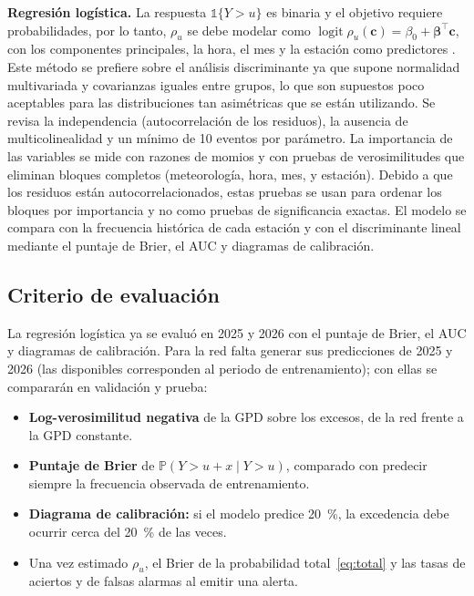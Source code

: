 \documentclass[11pt]{article}
\begin{document}
\textbf{Regresión logística.} La respuesta $\mathbb{1}\{Y>u\}$ es binaria y el objetivo requiere probabilidades, por lo tanto, $\rho_u$  se debe modelar como $\operatorname{logit}\rho_u(\mathbf{c}) = \beta_0 + \boldsymbol{\beta}^\top\mathbf{c}$, con los componentes principales, la hora, el mes y la estación como predictores \citep{gyarmati2017}. Este método se prefiere sobre el análisis discriminante ya que supone normalidad multivariada y covarianzas iguales entre grupos, lo que son supuestos poco aceptables para las distribuciones tan asimétricas que se están utilizando. Se revisa la independencia (autocorrelación de los residuos), la ausencia de multicolinealidad y un mínimo de 10 eventos por parámetro.  La importancia de las variables se mide con razones de momios y con pruebas de verosimilitudes que eliminan bloques completos (meteorología, hora, mes, y estación). Debido a que los residuos están autocorrelacionados, estas pruebas se usan para ordenar los bloques por importancia y no como pruebas de significancia exactas. El modelo se compara con la frecuencia histórica de cada estación y con el discriminante lineal mediante el puntaje de Brier, el AUC y diagramas de calibración. 

\subsection{Criterio de evaluación}
La regresión logística ya se evaluó en 2025 y 2026 con el puntaje de Brier, el AUC y diagramas de calibración. Para la red falta generar sus predicciones de 2025 y 2026 (las disponibles corresponden al periodo de entrenamiento); con ellas se compararán en validación y prueba:
\begin{itemize}[leftmargin=*]
    \item \textbf{Log-verosimilitud negativa} de la GPD sobre los excesos, de la red frente a la GPD constante.
    \item \textbf{Puntaje de Brier} de $\mathbb{P}(Y>u+x \mid Y>u)$, comparado con predecir siempre la frecuencia observada de entrenamiento.
    \item \textbf{Diagrama de calibración:} si el modelo predice 20~\%, la excedencia debe ocurrir cerca del 20~\% de las veces.
    \item Una vez estimado $\rho_u$, el Brier de la probabilidad total~\eqref{eq:total} y las tasas de aciertos y de falsas alarmas al emitir una alerta.

\end{itemize}
\end{document}
